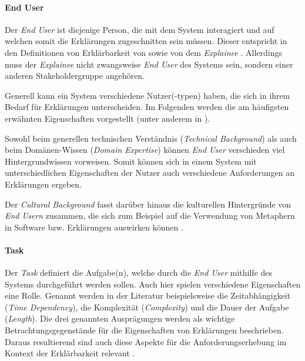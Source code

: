 \paragraph{End User} Der \textit{End User} ist diejenige Person, die mit dem System interagiert und auf welchen somit die Erklärungen zugeschnitten sein müssen. Dieser entspricht in den Definitionen von Erklärbarkeit von \citeauthor{chazette_knowledge_nodate} sowie von \citeauthor{kohl_explainability_2019} dem \textit{Explainee} \cite{chazette_knowledge_nodate, kohl_explainability_2019}. Allerdings muss der \textit{Explainee} nicht zwangsweise \textit{End User} des Systems sein, sondern einer anderen Stakeholdergruppe angehören.

Generell kann ein System verschiedene Nutzer(-typen) haben, die sich in ihrem Bedarf für Erklärungen unterscheiden. Im Folgenden werden die am häufigsten erwähnten Eigenschaften vorgestellt (unter anderem in \cite{chazette_knowledge_nodate,tintarev_designing_nodate,yamada_evaluating_2016}).

Sowohl beim generellen technischen Verständnis (\textit{Technical Background}) als auch beim Domänen-Wissen (\textit{Domain Expertise}) \cite{yamada_evaluating_2016} können \textit{End User} verschieden viel Hintergrundwissen vorweisen. Somit können sich in einem System mit unterschiedlichen Eigenschaften der  Nutzer auch verschiedene Anforderungen an Erklärungen ergeben.

Der \textit{Cultural Background} fasst darüber hinaus die kulturellen Hintergründe von \textit{End Usern} zusammen, die sich zum Beispiel auf die Verwendung von Metaphern in Software bzw. Erklärungen auswirken können \cite{salgado_cultural_2015}.

\paragraph{Task} Der \textit{Task} definiert die Aufgabe(n), welche durch die \textit{End User} mithilfe des Systems durchgeführt werden sollen. Auch hier spielen verschiedene Eigenschaften eine Rolle. Genannt werden in der Literatur beispielsweise die Zeitabhängigkeit (\textit{Time Dependency}), die Komplexität (\textit{Complexity}) und die Dauer der Aufgabe (\textit{Length}). Die drei genannten Ausprägungen werden als wichtige Betrachtungsgegenstände für die Eigenschaften von Erklärungen beschrieben. Daraus resultierend sind auch diese Aspekte für die Anforderungserhebung im Kontext der Erklärbarkeit relevant \cite{sokol_explainability_2020}.

